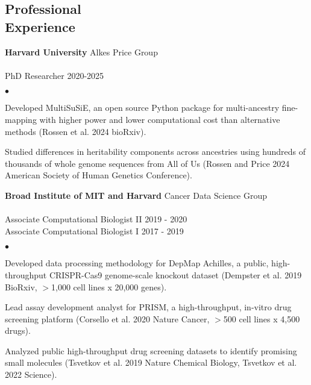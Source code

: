 \documentclass[margin,line]{res}
\newenvironment{list2}{
  \begin{list}{$\bullet$}{%
      \setlength{\itemsep}{0in}
      \setlength{\parsep}{0in} \setlength{\parskip}{0in}
      \setlength{\topsep}{0in} \setlength{\partopsep}{0in} 
      \setlength{\leftmargin}{0.2in}}}{\end{list}}
\begin{document}
\begin{resume}
\section{Professional \\Experience}
{\bf Harvard University} \hfill Alkes Price Group\\
\vspace{-.3cm}\\
PhD Researcher \hfill 2020-2025\\
\begin{list2}
\item Developed MultiSuSiE, an open source Python package for multi-ancestry fine-mapping with higher power and lower computational cost than alternative methods (Rossen et al. 2024 bioRxiv). 
\item Studied differences in heritability components across ancestries using hundreds of thousands of whole genome sequences from All of Us (Rossen and Price 2024 American Society of Human Genetics Conference).
\end{list2}
{\bf Broad Institute of MIT and Harvard} \hfill Cancer Data Science Group\\
\vspace{-.3cm}\\
Associate Computational Biologist II \hfill 2019 - 2020\\
Associate Computational Biologist I \hfill 2017 - 2019\\
\begin{list2}
\item Developed data processing methodology for DepMap Achilles, a public, high-throughput CRISPR-Cas9 genome-scale knockout dataset (Dempster et al. 2019 BioRxiv, $>$1,000 cell lines x 20,000 genes).
\item Lead assay development analyst for PRISM, a high-throughput, in-vitro drug screening platform (Corsello et al. 2020 Nature Cancer, $>$500 cell lines x 4,500 drugs).
\item Analyzed public high-throughput drug screening datasets to identify promising small molecules (Tsvetkov et al. 2019 Nature Chemical Biology, Tsvetkov et al. 2022 Science).

\end{list2}
\end{resume}
\end{document}
